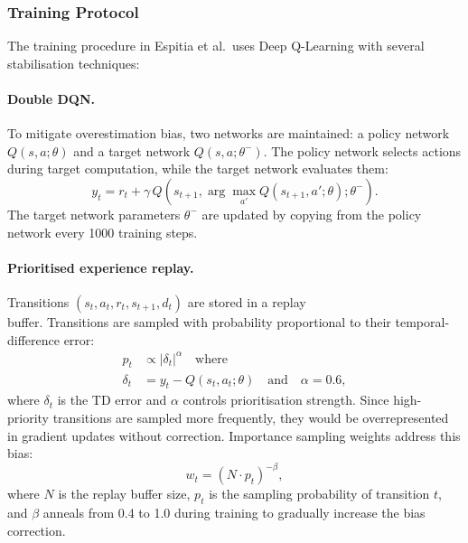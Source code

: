 \documentclass{article}
\theoremstyle{plain}
\theoremstyle{definition}
\begin{document}
\subsubsection{Training Protocol}

The training procedure in Espitia et al.\ uses Deep Q-Learning with several stabilisation techniques:

\paragraph{Double DQN.} To mitigate overestimation bias, two networks are maintained: a policy network $Q(s,a; \theta)$ and a target network $Q(s,a; \theta^-)$. The policy network selects actions during target computation, while the target network evaluates them:
\begin{equation}
y_t = r_t + \gamma \, Q(s_{t+1}, \arg\max_{a'} Q(s_{t+1}, a'; \theta) ; \theta^-).
\end{equation}
The target network parameters $\theta^-$ are updated by copying from the policy network every 1000 training steps.

\paragraph{Prioritised experience replay.} Transitions $(s_t, a_t, r_t, s_{t+1}, d_t)$ are stored in a replay \\buffer.
Transitions are sampled with probability proportional to their temporal-difference error:
\begin{align}
p_t &\propto |\delta_t|^\alpha \quad \text{where} \\
\delta_t &= y_t - Q(s_t, a_t; \theta) \quad \text{and} \quad \alpha = 0.6,
\end{align}
where $\delta_t$ is the TD error and $\alpha$ controls prioritisation strength. Since high-priority transitions are sampled more frequently, they would be overrepresented in gradient updates without correction. Importance sampling weights address this bias:
\begin{equation}
w_t = {(N \cdot p_t)}^{-\beta},
\end{equation}
where $N$ is the replay buffer size, $p_t$ is the sampling probability of transition $t$, and $\beta$ anneals from 0.4 to 1.0 during training to gradually increase the bias correction.
\end{document}
